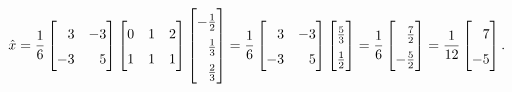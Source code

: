 \[
    \hat x = \frac{1}{6}
    \begin{bmatrix}
        \phantom{-}3 & -3 \\
        -3 & \phantom{-}5
    \end{bmatrix}
    \begin{bmatrix}
        0 & 1 & 2 \\
        1 & 1 & 1
    \end{bmatrix}
    \begingroup
        \renewcommand*{\arraystretch}{1.5}
        \begin{bmatrix}
            -\frac{1}{2} \\
            \phantom{-}\frac{1}{3} \\
            \phantom{-}\frac{2}{3}
        \end{bmatrix}
    \endgroup = \frac{1}{6}
    \begin{bmatrix}
        \phantom{-}3 & -3 \\
        -3 & \phantom{-}5
    \end{bmatrix}
    \begingroup
        \renewcommand*{\arraystretch}{1.5}
        \begin{bmatrix}
            \frac{5}{3} \\
            \frac{1}{2}
        \end{bmatrix}
    \endgroup = \frac{1}{6}
    \begingroup
        \renewcommand*{\arraystretch}{1.5}
        \begin{bmatrix}
            \phantom{-}\frac{7}{2} \\
            -\frac{5}{2}
        \end{bmatrix}
    \endgroup = \frac{1}{12}
    \begin{bmatrix}
        \phantom{-}7 \\
        -5
    \end{bmatrix}.
\]

